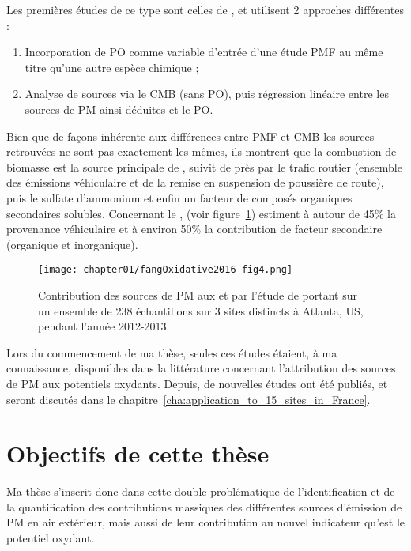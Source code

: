 Les premières études de ce type sont celles de
\textcite{vermaReactive2014,batesReactive2015,fangOxidative2016}, et utilisent 2 approches
différentes :
\begin{enumerate}
    \item Incorporation de PO comme variable d'entrée d'une étude PMF au même titre qu'une
        autre espèce chimique ;
    \item Analyse de sources via le CMB (sans PO), puis régression linéaire entre les
        sources de PM ainsi déduites et le PO.
\end{enumerate}
Bien que de façons inhérente aux différences entre PMF et CMB les sources retrouvées ne
sont pas exactement les mêmes, ils montrent que la combustion de biomasse est la source
principale de \PODTTv, suivit de près par le trafic routier (ensemble des émissions
véhiculaire et de la remise en suspension de poussière de route), puis le sulfate
d'ammonium et enfin un facteur de composés organiques secondaires solubles.
Concernant le \POAAv, \textcite{fangOxidative2016} (voir
figure~\ref{fig:chapter01/fangOxidative2016-fig4}) estiment à autour de 45\% la
provenance véhiculaire et à environ 50\% la contribution de facteur secondaire (organique
et inorganique).

\begin{figure}[ht]
    \centering
    \texttt{[image: chapter01/fangOxidative2016-fig4.png]}
    \caption{Contribution des sources de PM aux \POAAv{} et \PODTTv{} par l'étude de
    \textcite{fangOxidative2016} portant sur un ensemble de 238 échantillons sur 3 sites
        distincts à Atlanta, US, pendant l'année 2012-2013.}%
    \label{fig:chapter01/fangOxidative2016-fig4}
\end{figure}

Lors du commencement de ma thèse, seules ces études étaient, à ma connaissance,
disponibles dans la littérature concernant l'attribution des sources de PM aux potentiels
oxydants.  Depuis, de nouvelles études ont été publiés, et seront discutés dans le
chapitre~\ref{cha:application_to_15_sites_in_France}.


\section{Objectifs de cette thèse}%
\label{sec:positionnement_de_cette_thèse}

Ma thèse s'inscrit donc dans cette double problématique de l'identification et de la
quantification des contributions massiques des différentes sources d'émission de PM en air
extérieur, mais aussi de leur contribution au nouvel indicateur qu'est le potentiel
oxydant.

